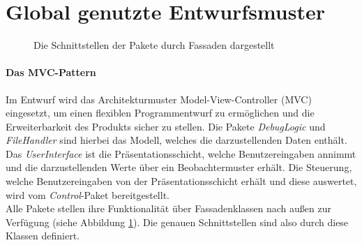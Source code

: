 \documentclass[parskip=full]{scrartcl}
\begin{document}
\newpage
\section{Global genutzte Entwurfsmuster}
\label{GlobalePatterns}
\begin{figure}[!h]
\caption{Die Schnittstellen der Pakete durch Fassaden dargestellt}
\label{fig:fassaden}
\end{figure}
\paragraph{Das MVC-Pattern}
Im Entwurf wird das Architekturmuster Model-View-Controller (MVC) eingesetzt, um einen flexiblen Programmentwurf zu ermöglichen und die Erweiterbarkeit des Produkts sicher zu stellen. Die Pakete \textit{DebugLogic} und \textit{FileHandler} sind hierbei das Modell, welches die darzustellenden Daten enthält. Das \textit{UserInterface} ist die Präsentationsschicht, welche Benutzereingaben annimmt und die darzustellenden Werte über ein Beobachtermuster erhält. Die Steuerung, welche Benutzereingaben von der Präsentationsschicht erhält und diese auswertet, wird vom \textit{Control}-Paket bereitgestellt. \\
Alle Pakete stellen ihre Funktionalität über Fassadenklassen nach außen zur Verfügung (siehe Abbildung \ref{fig:fassaden}). Die genauen Schnittstellen sind also durch diese Klassen definiert.
\end{document}
